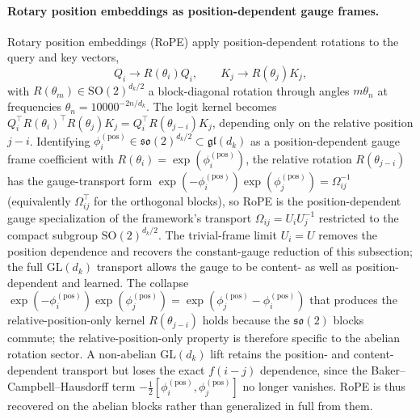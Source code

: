 \documentclass[11pt]{article}
\begin{document}
\paragraph{Rotary position embeddings as position-dependent gauge frames.}
Rotary position embeddings (RoPE) \cite{su2024roformer} apply position-dependent rotations to the query and key vectors,
\begin{equation}
Q_i \to R(\theta_i) Q_i, \qquad K_j \to R(\theta_j) K_j,
\label{eq:rope_apply}
\end{equation}
with $R(\theta_m) \in \mathrm{SO}(2)^{d_k/2}$ a block-diagonal rotation through angles $m\theta_n$ at frequencies $\theta_n = 10000^{-2n/d_k}$. The logit kernel becomes $Q_i^\top R(\theta_i)^\top R(\theta_j) K_j = Q_i^\top R(\theta_{j-i}) K_j$, depending only on the relative position $j - i$. Identifying $\phi_i^{(\mathrm{pos})} \in \mathfrak{so}(2)^{d_k/2} \subset \mathfrak{gl}(d_k)$ as a position-dependent gauge frame coefficient with $R(\theta_i) = \exp(\phi_i^{(\mathrm{pos})})$, the relative rotation $R(\theta_{j-i})$ has the gauge-transport form $\exp(-\phi_i^{(\mathrm{pos})})\exp(\phi_j^{(\mathrm{pos})}) = \Omega_{ij}^{-1}$ (equivalently $\Omega_{ij}^\top$ for the orthogonal blocks), so RoPE is the position-dependent gauge specialization of the framework's transport $\Omega_{ij} = U_iU_j^{-1}$ restricted to the compact subgroup $\mathrm{SO}(2)^{d_k/2}$. The trivial-frame limit $U_i = U$ removes the position dependence and recovers the constant-gauge reduction of this subsection; the full $\mathrm{GL}(d_k)$ transport allows the gauge to be content- as well as position-dependent and learned. The collapse $\exp(-\phi_i^{(\mathrm{pos})})\exp(\phi_j^{(\mathrm{pos})}) = \exp(\phi_j^{(\mathrm{pos})} - \phi_i^{(\mathrm{pos})})$ that produces the relative-position-only kernel $R(\theta_{j-i})$ holds because the $\mathfrak{so}(2)$ blocks commute; the relative-position-only property is therefore specific to the abelian rotation sector. A non-abelian $\mathrm{GL}(d_k)$ lift retains the position- and content-dependent transport but loses the exact $f(i-j)$ dependence, since the Baker--Campbell--Hausdorff term $-\tfrac{1}{2}[\phi_i^{(\mathrm{pos})}, \phi_j^{(\mathrm{pos})}]$ no longer vanishes. RoPE is thus recovered on the abelian blocks rather than generalized in full from them.
\end{document}
